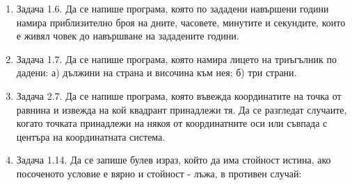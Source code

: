 \begin{enumerate}[resume]

	\item Задача 1.6.\cite{sbornik} Да се напише програма, която по зададени навършени години намира приблизително броя на дните, часовете, минутите и секундите, които е живял човек до навършване на зададените години.

	\item Задача 1.7.\cite{sbornik} Да се напише програма, която намира лицето на триъгълник по дадени: а) дължини на страна и височина към нея; б) три страни.


	\item Задача 2.7.\cite{sbornik} Да се напише програма, която въвежда координатите на точка от равнина и извежда на кой квадрант принадлежи тя. Да се разгледат случаите, когато точката принадлежи на някоя от координатните оси или съвпада с центъра на координатната система.

	\item Задача 1.14.\cite{sbornik} Да се запише булев израз, който да има стойност истина, ако посоченото условие е вярно и стойност - лъжа, в противен случай:

	\renewcommand{\theenumii}{\Alph{enumii}}


\end{enumerate}

